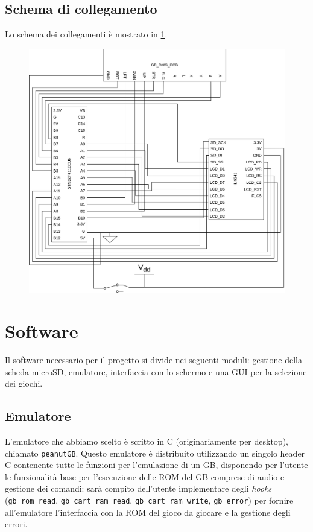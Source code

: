 \documentclass[hidelinks,12pt]{article}
\begin{document}
\subsection{Schema di collegamento}
Lo schema dei collegamenti è mostrato in \cref{fig:schema}.
\begin{figure}[h]
	\begin{center}
		\includegraphics[scale=0.65]{figures/scheme.png}
		\caption{}
		\label{fig:schema}
	\end{center}
\end{figure}

\section{Software}
Il software necessario per il progetto si divide nei seguenti moduli: gestione
della scheda microSD, emulatore, interfaccia con lo schermo e una GUI per la
selezione dei giochi.

\subsection{Emulatore}
L'emulatore che abbiamo scelto è scritto in C (originariamente per desktop),
chiamato \texttt{peanutGB}. Questo emulatore è distribuito utilizzando un
singolo header C contenente tutte le funzioni per l'emulazione di un GB,
disponendo per l'utente le funzionalità base per l'esecuzione delle ROM del GB
comprese di audio e gestione dei comandi: sarà compito dell'utente implementare
degli \textit{hooks} (\texttt{gb\_rom\_read}, \texttt{gb\_cart\_ram\_read},
\texttt{gb\_cart\_ram\_write}, \texttt{gb\_error}) per fornire all'emulatore
l'interfaccia con la  ROM del gioco da giocare e la gestione degli errori. 
\end{document}
